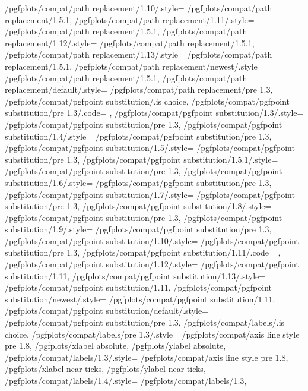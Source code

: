 {	/pgfplots/compat/path replacement/1.10/.style=   	{/pgfplots/compat/path replacement/1.5.1},
	/pgfplots/compat/path replacement/1.11/.style=   	{/pgfplots/compat/path replacement/1.5.1},
	/pgfplots/compat/path replacement/1.12/.style=   	{/pgfplots/compat/path replacement/1.5.1},
	/pgfplots/compat/path replacement/1.13/.style=   	{/pgfplots/compat/path replacement/1.5.1},
	/pgfplots/compat/path replacement/newest/.style= 	{/pgfplots/compat/path replacement/1.5.1},%
	/pgfplots/compat/path replacement/default/.style=	{/pgfplots/compat/path replacement/pre 1.3},%
	/pgfplots/compat/pgfpoint substitution/.is choice,
	/pgfplots/compat/pgfpoint substitution/pre 1.3/.code= {\pgfplots@substitute@pgfpointfalse},
	/pgfplots/compat/pgfpoint substitution/1.3/.style=    {/pgfplots/compat/pgfpoint substitution/pre 1.3},%
	/pgfplots/compat/pgfpoint substitution/1.4/.style=  	 {/pgfplots/compat/pgfpoint substitution/pre 1.3},
	/pgfplots/compat/pgfpoint substitution/1.5/.style=    {/pgfplots/compat/pgfpoint substitution/pre 1.3},%
	/pgfplots/compat/pgfpoint substitution/1.5.1/.style=	{/pgfplots/compat/pgfpoint substitution/pre 1.3},%
	/pgfplots/compat/pgfpoint substitution/1.6/.style=   	{/pgfplots/compat/pgfpoint substitution/pre 1.3},
	/pgfplots/compat/pgfpoint substitution/1.7/.style=   	{/pgfplots/compat/pgfpoint substitution/pre 1.3},
	/pgfplots/compat/pgfpoint substitution/1.8/.style=   	{/pgfplots/compat/pgfpoint substitution/pre 1.3},
	/pgfplots/compat/pgfpoint substitution/1.9/.style=   	{/pgfplots/compat/pgfpoint substitution/pre 1.3},
	/pgfplots/compat/pgfpoint substitution/1.10/.style=   	{/pgfplots/compat/pgfpoint substitution/pre 1.3},
	/pgfplots/compat/pgfpoint substitution/1.11/.code=   	{\pgfplots@substitute@pgfpointtrue},
	/pgfplots/compat/pgfpoint substitution/1.12/.style=   	{/pgfplots/compat/pgfpoint substitution/1.11},
	/pgfplots/compat/pgfpoint substitution/1.13/.style=   	{/pgfplots/compat/pgfpoint substitution/1.11},
	/pgfplots/compat/pgfpoint substitution/newest/.style= 	{/pgfplots/compat/pgfpoint substitution/1.11},%
	/pgfplots/compat/pgfpoint substitution/default/.style=	{/pgfplots/compat/pgfpoint substitution/pre 1.3},%
	/pgfplots/compat/labels/.is choice,
	/pgfplots/compat/labels/pre 1.3/.style={%
		/pgfplots/compat/axis line style pre 1.8,
		/pgfplots/xlabel absolute,
		/pgfplots/ylabel absolute},%
	/pgfplots/compat/labels/1.3/.style={%
		/pgfplots/compat/axis line style pre 1.8,
		/pgfplots/xlabel near ticks,
		/pgfplots/ylabel near ticks},%
	/pgfplots/compat/labels/1.4/.style=		{/pgfplots/compat/labels/1.3},%
}
